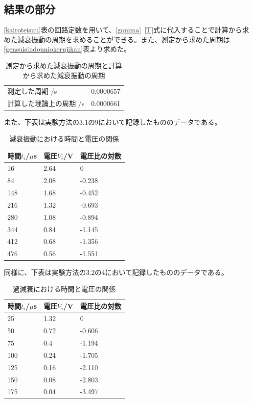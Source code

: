 \documentclass{jsarticle}
\begin{document}
\subsection{結果の部分}

\ref{kairoteisuu}表の回路定数を用いて、\ref{gamma}~\ref{T}式に代入することで計算から求めた減衰振動の周期を求めることができる。また、測定から求めた周期は\ref{gensuisindouniokerujikan}表より求めた。

\begin{table}[H]
    \centering
    \caption{測定から求めた減衰振動の周期と計算から求めた減衰振動の周期}
    \label{my-label}
    \begin{tabular}{|l|l|}
    測定した周期 /s    & 0.0000657 \\
    計算した理論上の周期  /s & 0.0000661
    \end{tabular}
    \end{table}

また、下表は実験方法の3.1の9において記録したもののデータである。

\begin{table}[H]
\centering
\caption{減衰振動における時間と電圧の関係}
\label{my-label}
\begin{tabular}{lll}
\hline
時間$t_i$/$\mu$s & 電圧$V_i$/V & 電圧比の対数 \\ \hline
16     & 2.64   & 0      \\
84     & 2.08   & -0.238 \\
148    & 1.68   & -0.452 \\
216    & 1.32   & -0.693 \\
280    & 1.08   & -0.894 \\
344    & 0.84   & -1.145 \\
412    & 0.68   & -1.356 \\
476    & 0.56   & -1.551
\end{tabular}
\end{table}

同様に、下表は実験方法の3.2の4において記録したもののデータである。

\begin{table}[H]
\centering
\caption{過減衰における時間と電圧の関係}
\label{my-label}
\begin{tabular}{lll}
\hline
    時間$t_i$/$\mu$s & 電圧$V_i$/V & 電圧比の対数 \\ \hline
    25     & 1.32   & 0      \\
    50     & 0.72   & -0.606 \\
    75     & 0.4    & -1.194 \\
    100    & 0.24   & -1.705 \\
    125    & 0.16   & -2.110 \\
    150    & 0.08   & -2.803 \\
    175    & 0.04   & -3.497 \\
\end{tabular}
\end{table}
\end{document}
